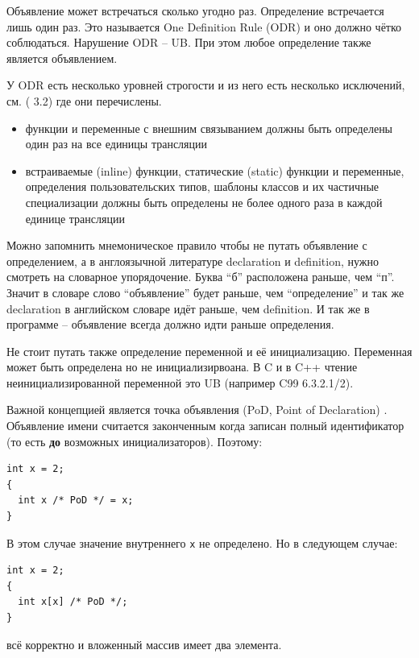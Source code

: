 \documentclass[a4paper,12pt,oneside]{article}
\begin{document}
Объявление может встречаться сколько угодно раз. Определение встречается лишь один раз. Это называется One Definition Rule (ODR) и оно должно чётко соблюдаться. Нарушение ODR -- UB. При этом любое определение также является объявлением.

У ODR есть несколько уровней строгости и из него есть несколько исключений, см. (\cite{stdcpp14} 3.2) где они перечислены.

\begin{itemize}
\item функции и переменные с внешним связыванием должны быть определены один раз на все единицы трансляции
\item встраиваемые (inline) функции, статические (static) функции и переменные, определения пользовательских типов, шаблоны классов и их частичные специализации должны быть определены не более одного раза в каждой единице трансляции
\end{itemize}

Можно запомнить мнемоническое правило чтобы не путать объявление с определением, а в англоязычной литературе declaration и definition, нужно смотреть на словарное упорядочение.  Буква ``б'' расположена раньше, чем ``п''. Значит в словаре слово ``объявление'' будет раньше, чем ``определение'' и так же declaration в английском словаре идёт раньше, чем definition. И так же в программе – объявление всегда должно идти раньше определения.

Не стоит путать также определение переменной и её инициализацию. Переменная может быть определена но не инициализирвоана. В C и в C++ чтение неинициализированной переменной это UB (например C99 6.3.2.1/2).

Важной концепцией является точка объявления (PoD, Point of Declaration) . Объявление имени считается законченным когда записан полный идентификатор (то есть \textbf{до} возможных инициализаторов). Поэтому:

\begin{lstlisting}
int x = 2;
{
  int x /* PoD */ = x;
}
\end{lstlisting}

В этом случае значение внутреннего \lstinline!x! не определено. Но в следующем случае:

\begin{lstlisting}
int x = 2;
{
  int x[x] /* PoD */;
}
\end{lstlisting}

всё корректно и вложенный массив имеет два элемента.
\end{document}
